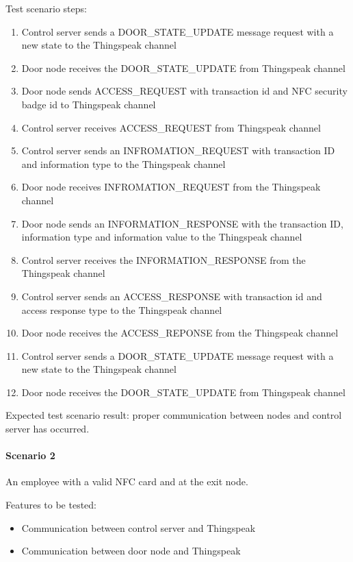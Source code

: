 \noindent
Test scenario steps:
\begin{enumerate}
    \item Control server sends a DOOR\_STATE\_UPDATE message request with a new
          state to the Thingspeak channel
    \item Door node receives the DOOR\_STATE\_UPDATE from Thingspeak channel 
    \item Door node sends ACCESS\_REQUEST with transaction id and NFC security
          badge id to Thingspeak channel
    \item Control server receives ACCESS\_REQUEST from Thingspeak channel 
    \item Control server sends an INFROMATION\_REQUEST with transaction ID and
          information type to the Thingspeak channel
    \item Door node receives INFROMATION\_REQUEST from the Thingspeak channel 
    \item Door node sends an INFORMATION\_RESPONSE with the transaction ID,
          information type and information value to the Thingspeak channel
    \item Control server receives the INFORMATION\_RESPONSE from the Thingspeak
          channel
    \item Control server sends an ACCESS\_RESPONSE with transaction id and
          access response type to the Thingspeak channel
    \item Door node receives the ACCESS\_REPONSE from the Thingspeak channel
    \item Control server sends a DOOR\_STATE\_UPDATE message request with a new
          state to the Thingspeak channel
    \item Door node receives the DOOR\_STATE\_UPDATE from Thingspeak channel 
\end{enumerate}

\noindent
Expected test scenario result: proper communication between nodes and control
server has occurred.

\paragraph{Scenario 2}
An employee with a valid NFC card and at the exit node.

\noindent
Features to be tested:
\begin{itemize}
    \item Communication between control server and Thingspeak
    \item Communication between door node and Thingspeak
\end{itemize}

